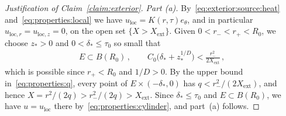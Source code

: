\documentclass[11pt,reqno]{amsproc}
\numberwithin{equation}{section}
\theoremstyle{remark}
\begin{document}
\begin{proof}[Justification of Claim~\ref{claim:exterior}]
\noindent\emph{Part (a).} By~\eqref{eq:exterior:source:heat} and~\eqref{eq:properties:local} we have $u_{\mathrm{loc}}=K(r,\tau)e_\theta$, and in particular $u_{\mathrm{loc},r}=u_{\mathrm{loc},z}=0$, on the open set $\{X>X_{\mathrm{ext}}\}$. Given $0<r_-<r_+<R_0$, we choose $z_*>0$ and $0<\delta_*\le\tau_0$ so small that
\begin{align*}
E\subset B(R_0)
\,,\qquad
C_0\bigl(\delta_*+z_*^{1/D}\bigr)<\frac{r_-^2}{2X_{\mathrm{ext}}}
\,,
\end{align*}
which is possible since $r_+<R_0$ and $1/D>0$. By the upper bound in~\eqref{eq:properties:q}, every point of $E\times(-\delta_*,0)$ has $q<r_-^2/(2X_{\mathrm{ext}})$, and hence $X=r^2/(2q)>r_-^2/(2q)>X_{\mathrm{ext}}$. Since $\delta_*\le\tau_0$ and $E\subset B(R_0)$, we have $u=u_{\mathrm{loc}}$ there by~\eqref{eq:properties:cylinder}, and part~(a) follows.


\end{proof}
\end{document}
